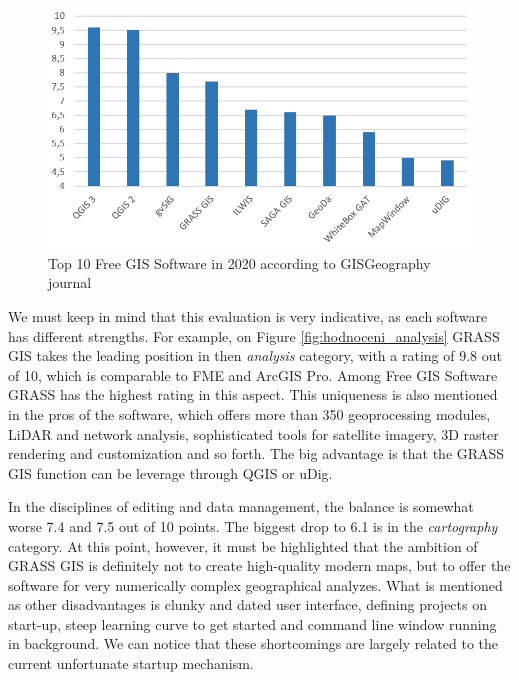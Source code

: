 \documentclass[a4paper,10pt,twoside]{article}
\begin{document}
\begin{figure}[hbt!] 
\begin{center}
\includegraphics[width=12cm]{../pictures/hodnoceni_free.png} 
\caption[Top 10 Free GIS Software in 2020 according to GISGeography journal]{Top 10 Free GIS Software in 2020 according to GISGeography journal}
\label{fig:hodnoceni_free}
\end{center}
\end{figure}

\newpage
\noindent We must keep in mind that this evaluation is very indicative, as each software has different strengths. For example, on Figure \ref{fig:hodnoceni_analysis} GRASS GIS takes the leading position in then \textit{analysis} category, with a rating of 9.8 out of 10, which is comparable to FME and ArcGIS Pro. Among Free GIS Software GRASS has the highest rating in this aspect. This uniqueness is also mentioned in the pros of the software, which offers more than 350 geoprocessing modules, LiDAR and network analysis, sophisticated tools for satellite imagery, 3D raster rendering and customization and so forth.  The big advantage is that the GRASS GIS function can be leverage through QGIS or uDig. 

\newpage
In the disciplines of editing and data management, the balance is somewhat worse 7.4 and 7.5 out of 10 points. The biggest drop to 6.1 is in the \textit{cartography} category. At this point, however, it must be highlighted that the ambition of GRASS GIS is definitely not to create high-quality modern maps, but to offer the software for very numerically complex geographical analyzes. What is mentioned as other disadvantages is clunky and dated user interface, defining projects on start-up, steep learning curve to get started and command line window running in background. We can notice that these shortcomings are largely related to the current unfortunate startup mechanism.
\end{document}
